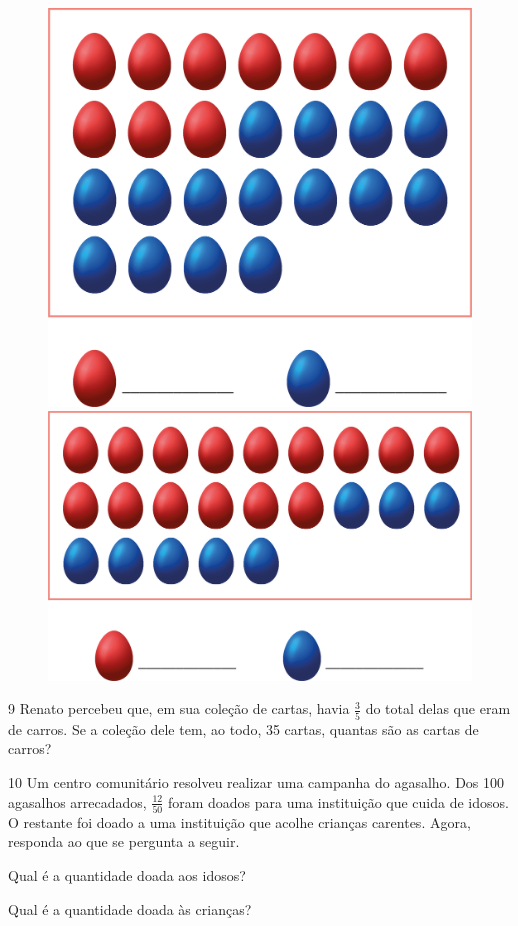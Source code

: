 \begin{figure}[htpb!]
\centering
\includegraphics[width=.4\textwidth]{media/image64.png}
\includegraphics[width=.4\textwidth]{media/image65.png}
\end{figure}


\num{9} Renato percebeu que, em sua coleção de cartas, havia $\frac{3}{5}$ do total delas
que eram de carros. Se a coleção dele tem, ao todo, 35 cartas, quantas são
as cartas de carros?

\begin{mdframed}[linewidth=2pt,linecolor=salmao,roundcorner=2pt]
\vspace{2cm}
\end{mdframed}

\num{10} Um centro comunitário resolveu realizar uma campanha do agasalho. Dos
100 agasalhos arrecadados, $\frac{12}{50}$ foram doados para uma instituição que
cuida de idosos. O restante foi doado a uma instituição que acolhe
crianças carentes. Agora, responda ao que se pergunta a seguir.

\begin{escolha}
\item
  Qual é a quantidade doada aos idosos?


\item
  Qual é a quantidade doada às crianças?

\end{escolha}


